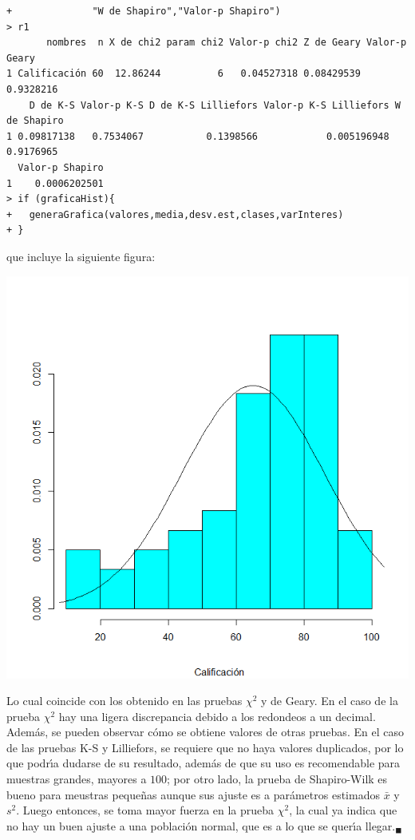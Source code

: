 \begin{solucion}
\begin{verbatim}
+              "W de Shapiro","Valor-p Shapiro")
> r1
       nombres  n X de chi2 param chi2 Valor-p chi2 Z de Geary Valor-p Geary
1 Calificación 60  12.86244          6   0.04527318 0.08429539     0.9328216
    D de K-S Valor-p K-S D de K-S Lilliefors Valor-p K-S Lilliefors W de Shapiro
1 0.09817138   0.7534067           0.1398566            0.005196948    0.9176965
  Valor-p Shapiro
1    0.0006202501
> if (graficaHist){
+   generaGrafica(valores,media,desv.est,clases,varInteres)
+ }
 \end{verbatim}
 \vspace{-0.5cm}
 que incluye la siguiente figura:
 \begin{center}
  \includegraphics[scale=0.35]{Problema_88.png}
 \end{center}
 Lo cual coincide con los obtenido en las pruebas $\chi^2$ y de Geary.
 En el caso de la prueba $\chi^2$ hay una ligera discrepancia
 debido a los redondeos a un decimal.
 Adem\'as, se pueden observar c\'omo se obtiene valores de otras pruebas.
 En el caso de las pruebas K-S y Lilliefors, se requiere que no haya valores
 duplicados, por lo que podr\'{\i}a dudarse de su resultado,
 adem\'as de que su uso es recomendable para muestras grandes, mayores a $100$;
 por otro lado, la prueba de Shapiro-Wilk es bueno para meustras peque\~nas
 aunque sus ajuste es a par\'ametros estimados $\bar{x}$ y $s^2$.
 Luego entonces, se toma mayor fuerza en la prueba $\chi^2$,
 la cual ya indica que no hay un buen ajuste a una poblaci\'on normal,
 que es a lo que se quer\'{\i}a llegar.${}_{\blacksquare}$
\end{solucion}
